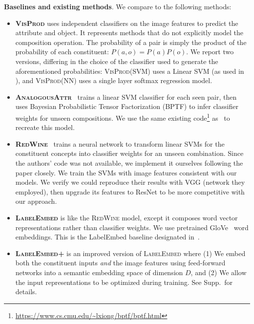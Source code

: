 \documentclass[runningheads]{llncs}
\newcommand{\SC}[1]{{\textsc{#1}}}
\begin{document}
\vspace{0.05in}
\noindent\textbf{Baselines and existing methods}. We compare to the following methods:
\begin{itemize}
\item \textbf{\SC{VisProd}} uses independent classifiers on the image features to predict the attribute and object.  It represents methods that do not explicitly model the composition operation. The probability of a pair is simply the product of the probability of each constituent: $P(a,o) = P(a)P(o)$. We report two versions, differing in the choice of the classifier used to generate the aforementioned probabilities: \SC{VisProd(SVM)} uses a Linear SVM (as used in \cite{misra2017red}), and \SC{VisProd(NN)} uses a single layer softmax regression model. 

\item \textbf{\SC{AnalogousAttr}}~\cite{chen2014inferring} trains a linear SVM classifier for each seen pair, then uses Bayesian Probabilistic Tensor Factorization (BPTF) to infer classifier weights for unseen compositions. We use the same existing code\footnote{\url{https://www.cs.cmu.edu/~lxiong/bptf/bptf.html}} as~\cite{chen2014inferring} to recreate this model.

\item \textbf{\SC{RedWine}}~\cite{misra2017red} trains a neural network to transform linear SVMs for the constituent concepts into classifier weights for an unseen combination. Since the authors' code was not available, we implement it  ourselves following the paper closely.  We train the SVMs with image features consistent with our models. We verify we could reproduce their results with VGG (network they employed), then upgrade its features to ResNet to be more competitive with our approach. 

\item \textbf{\SC{LabelEmbed}} is like the \SC{RedWine} model, except it composes word vector representations rather than classifier weights. We use pretrained GloVe~\cite{pennington2014glove} word embeddings. This is the LabelEmbed baseline designated in~\cite{misra2017red}. 

\item \textbf{\SC{LabelEmbed+}} is an improved version of \SC{LabelEmbed} where (1) We embed both the constituent inputs \emph{and} the image features using feed-forward networks into a semantic embedding space of dimension $D$, and (2) We allow the input representations to be optimized during training. See Supp.~for details.
\end{itemize} 
\end{document}
